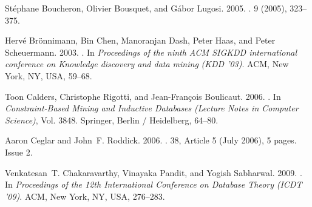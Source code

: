\begin{thebibliography}{00}
{St\'{e}phane Boucheron}, {Olivier Bousquet}, {and} {G\'{a}bor Lugosi}. 2005.
\newblock {}.
  {9} (2005), 323--375.


{Herv\'{e} Br\"{o}nnimann}, {Bin Chen}, {Manoranjan Dash}, {Peter Haas}, {and}
  {Peter Scheuermann}. 2003.
\newblock {}. In {\em
  Proceedings of the ninth ACM SIGKDD international conference on Knowledge
  discovery and data mining} {\em (KDD '03)}. ACM, New York, NY, USA, 59--68.


{Toon Calders}, {Christophe Rigotti}, {and} {Jean-Fran{\c c}ois Boulicaut}.
  2006.
\newblock {}. In {\em Constraint-Based Mining and Inductive Databases} {\em (Lecture
  Notes in Computer Science)}, Vol. 3848. Springer, Berlin / Heidelberg,
  64--80.


{Aaron Ceglar} {and} {John~F. Roddick}. 2006.
\newblock {}.
  {38}, Article 5 (July 2006), 5 pages.
\newblock
Issue 2.


{Venkatesan~T. Chakaravarthy}, {Vinayaka Pandit}, {and} {Yogish Sabharwal}.
  2009.
\newblock {}. In {\em Proceedings of the 12th International Conference on
  Database Theory} {\em (ICDT '09)}. ACM, New York, NY, USA, 276--283.



\end{thebibliography}
